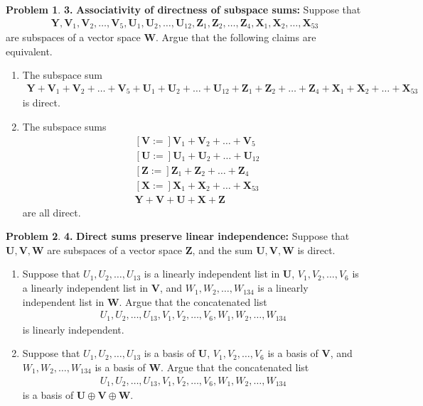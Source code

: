 \documentclass{book}
\theoremstyle{definition}
\newtheorem*{prob*}{Problem}
\newcommand{\V}{\mathbf{V}}
\newcommand{\W}{\mathbf{W}}
\newcommand{\Z}{\mathbf{Z}}
\newcommand{\Y}{\mathbf{Y}}
\newcommand{\U}{\mathbf{U}}
\newcommand{\X}{\mathbf{X}}
\begin{document}
\begin{prob*} \textbf{3.} \textbf{Associativity of directness of subspace sums:} Suppose that 
	\begin{align*}
	\Y, \V_1, \V_2, \dots, \V_5, \U_1, \U_2, \dots, \U_{12},\Z_1,\Z_2,\dots,\Z_4, \X_1, \X_2, \dots,\X_{53}
	\end{align*}
	are subspaces of a vector space $\W$. Argue that the following claims are equivalent. 
	\begin{enumerate}
		\item The subspace sum 
		\begin{align*}
		\Y+ \V_1+ \V_2+\dots+ \V_5+ \U_1+ \U_2+ \dots+ \U_{12}+\Z_1+\Z_2+\dots+\Z_4+ \X_1+ \X_2+ \dots+\X_{53}
		\end{align*}
		is direct. 
		\item The subspace sums
		\begin{align*}
		&\left[\V :=  \right] \V_1 +\V_2 + \dots + \V_5\\
		&\left[\U :=  \right] \U_1 +\U_2 + \dots + \U_{12}\\
		&\left[\Z :=  \right] \Z_1 +\Z_2 + \dots + \Z_4\\
		&\left[\X :=  \right] \X_1 +\X_2 + \dots + \X_{53}\\
		&\Y + \V + \U + \X + \Z
		\end{align*}
		are all direct. 
	\end{enumerate}

\end{prob*}


\newpage

\begin{prob*} \textbf{4.} \textbf{Direct sums preserve linear independence:} Suppose that $\U,\V,\W$ are subspaces of a vector space $\Z$, and the sum $\U,\V,\W$ is direct. 
	\begin{enumerate}
		\item Suppose that $U_1,U_2,\dots,U_{13}$ is a linearly independent list in $\U$, $V_1,V_2,\dots,V_{6}$ is a linearly independent list in $\V$, and $W_1,W_2,\dots,W_{134}$ is a linearly independent list in $\W$. Argue that the concatenated list 
		\begin{align*}
		U_1,U_2,\dots,U_{13},V_1,V_2,\dots,V_{6},W_1,W_2,\dots,W_{134}
		\end{align*}
		is linearly independent. 
		\item Suppose that $U_1,U_2,\dots,U_{13}$ is a basis of $\U$, $V_1,V_2,\dots,V_{6}$ is a basis of $\V$, and $W_1,W_2,\dots,W_{134}$ is a basis of $\W$. Argue that the concatenated list
		\begin{align*}
		U_1,U_2,\dots,U_{13},V_1,V_2,\dots,V_{6},W_1,W_2,\dots,W_{134}
		\end{align*}
		is a basis of $\U \oplus \V \oplus \W$.
	\end{enumerate}

\end{prob*}
\end{document}
